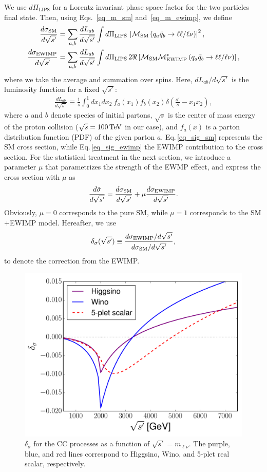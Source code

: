 \documentclass[12pt, a4paper]{article}
\begin{document}
We use $d\Pi_{\mathrm{LIPS}}$ for a Lorentz invariant phase space factor for the two particles final state.  Then, using Eqs.~\eqref{eq_m_sm} and~\eqref{eq_m_ewimp}, we define
\begin{align}
 \frac{d \sigma_{\rm SM}}{d\sqrt{s'}} &= \sum_{a,b}
 \frac{dL_{ab}}{d\sqrt{s'}} \int d\Pi_{\mathrm{LIPS}}\, \left| \mathcal{M}_{\rm SM} \left( q_a
 \bar{q}_b \to \ell\ell / \ell\nu \right) \right|^2,\label{eq_sig_sm}\\
 \frac{d \sigma_{\rm EWIMP}}{d\sqrt{s'}} &= \sum_{a,b}
 \frac{dL_{ab}}{d\sqrt{s'}} \int d\Pi_{\mathrm{LIPS}}\, 2 \Re \left[ \mathcal{M}_{\rm SM}
 \mathcal{M}_{\rm EWIMP}^{*} \left( q_a \bar{q}_b \to \ell\ell / \ell\nu
 \right) \right],\label{eq_sig_ewimp}
\end{align}
where we take the average and summation over spins.  Here,
$dL_{ab} / d\sqrt{s'}$ is the luminosity function for a fixed
$\sqrt{s'}$:
\begin{align}
 \frac{d L_{ab}}{d\sqrt{s'}} \equiv \frac{1}{s} \int_0^1 dx_1
 dx_2~f_a(x_1) f_b(x_2) \delta\left(\frac{s'}{s} - x_1 x_2\right),
\end{align}
where $a$ and $b$ denote species of initial partons, $\sqrt{s}$ is the
center of mass energy of the proton collision ($\sqrt{s} = 100\,{\rm
  TeV}$ in our case), and $f_a(x)$ is a parton distribution function
(PDF) of the given parton $a$.  Eq.\,\eqref{eq_sig_sm} represents the
SM cross section, while Eq.\,\eqref{eq_sig_ewimp} the EWIMP
contribution to the cross section.  For the statistical treatment in
the next section, we introduce a parameter $\mu$ that parametrizes the
strength of the EWMP effect, and express the cross section with $\mu$
as
\begin{align}
 \frac{d\tilde{\sigma}}{d\sqrt{s'}} =
 \frac{d\sigma_{\rm SM}}{d\sqrt{s'}}
 + \mu \frac{d\sigma_{\rm EWIMP}}{d\sqrt{s'}}.
 \label{eq_diffcrosssection}
\end{align}
Obviously, $\mu=0$ corresponds to the pure SM, while $\mu=1$ corresponds to
the SM$+$EWIMP model.  Hereafter, we use
\begin{align}
 \delta_\sigma ( \sqrt{s'} ) \equiv \frac{d\sigma_{\rm
 EWIMP} / d\sqrt{s'}}{d\sigma_{\rm SM} /
 d\sqrt{s'}},\label{eq_dsigma}
\end{align}
to denote the correction from the EWIMP.

\begin{figure}[t]
 \centering
 \includegraphics[width=0.5\hsize]{sqsp_vs_del.pdf}
 \caption{$\delta_\sigma$ for the CC processes as a
 function of $\sqrt{s'} = m_{\ell\nu}$.  The purple, blue, and red
 lines correspond to Higgsino, Wino, and 5-plet real scalar,
 respectively.}  \label{fig_sqsp_vs_del}
\end{figure}
\end{document}

